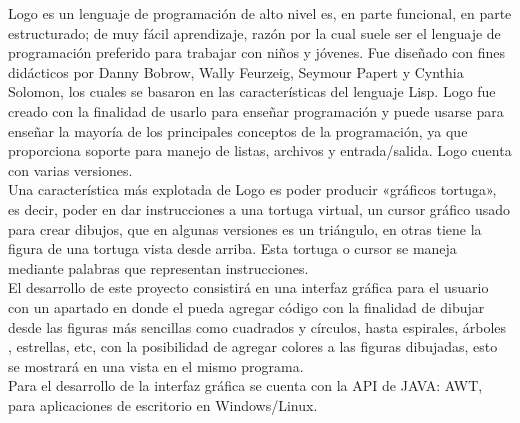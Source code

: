 Logo es un lenguaje de programación de alto nivel es, en parte funcional, en
parte estructurado; de muy fácil aprendizaje, razón por la cual suele ser el
lenguaje de programación preferido para trabajar con niños y jóvenes. Fue
diseñado con fines didácticos por Danny Bobrow, Wally Feurzeig, Seymour Papert y
Cynthia Solomon, los cuales se basaron en las características del lenguaje Lisp.
Logo fue creado con la finalidad de usarlo para enseñar programación y puede
usarse para enseñar la mayoría de los principales conceptos de la programación,
ya que proporciona soporte para manejo de listas, archivos y entrada/salida.
Logo cuenta con varias versiones.\\

Una característica más explotada de Logo es poder producir «gráficos tortuga»,
es decir, poder en dar instrucciones a una tortuga virtual, un cursor gráfico
usado para crear dibujos, que en algunas versiones es un triángulo, en otras
tiene la figura de una tortuga vista desde arriba. Esta tortuga o cursor se
maneja mediante palabras que representan instrucciones.\\

El desarrollo de este proyecto consistirá en una interfaz gráfica para el
usuario con un apartado en donde el pueda agregar código con la finalidad de
dibujar desde las figuras más sencillas como cuadrados y círculos, hasta
espirales, árboles , estrellas, etc, con la posibilidad de agregar colores a las
figuras dibujadas, esto se mostrará en una vista en el mismo programa.\\

Para el desarrollo de la interfaz gráfica se cuenta con la API de JAVA: AWT,
para  aplicaciones de escritorio en Windows/Linux.
